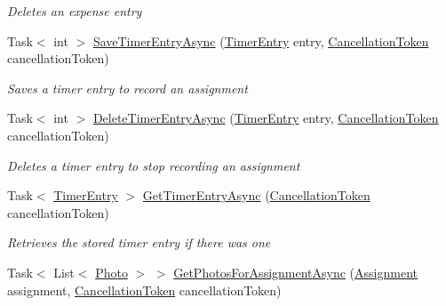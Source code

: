 \begin{DoxyCompactItemize}
\begin{DoxyCompactList}\small\item\em Deletes an expense entry \end{DoxyCompactList}\item 
Task$<$ int $>$ \hyperlink{class_field_service_1_1_tests_1_1_mocks_1_1_mock_assignment_service_a63732bc78fb6e33479130295a5f3618d}{Save\+Timer\+Entry\+Async} (\hyperlink{class_field_service_1_1_data_1_1_timer_entry}{Timer\+Entry} entry, \hyperlink{_view_models_2_assignment_view_model_8cs_aba80ec766846c61f55644fd23860cb18}{Cancellation\+Token} cancellation\+Token)
\begin{DoxyCompactList}\small\item\em Saves a timer entry to record an assignment \end{DoxyCompactList}\item 
Task$<$ int $>$ \hyperlink{class_field_service_1_1_tests_1_1_mocks_1_1_mock_assignment_service_a597928002e4546c7b25cb0cb37b04792}{Delete\+Timer\+Entry\+Async} (\hyperlink{class_field_service_1_1_data_1_1_timer_entry}{Timer\+Entry} entry, \hyperlink{_view_models_2_assignment_view_model_8cs_aba80ec766846c61f55644fd23860cb18}{Cancellation\+Token} cancellation\+Token)
\begin{DoxyCompactList}\small\item\em Deletes a timer entry to stop recording an assignment \end{DoxyCompactList}\item 
Task$<$ \hyperlink{class_field_service_1_1_data_1_1_timer_entry}{Timer\+Entry} $>$ \hyperlink{class_field_service_1_1_tests_1_1_mocks_1_1_mock_assignment_service_ac059b00f06f385dc180e9ff99017f389}{Get\+Timer\+Entry\+Async} (\hyperlink{_view_models_2_assignment_view_model_8cs_aba80ec766846c61f55644fd23860cb18}{Cancellation\+Token} cancellation\+Token)
\begin{DoxyCompactList}\small\item\em Retrieves the stored timer entry if there was one \end{DoxyCompactList}\item 
Task$<$ List$<$ \hyperlink{class_field_service_1_1_data_1_1_photo}{Photo} $>$ $>$ \hyperlink{class_field_service_1_1_tests_1_1_mocks_1_1_mock_assignment_service_aade7ccd217b9b7f237f2891719ff5a4c}{Get\+Photos\+For\+Assignment\+Async} (\hyperlink{class_field_service_1_1_data_1_1_assignment}{Assignment} assignment, \hyperlink{_view_models_2_assignment_view_model_8cs_aba80ec766846c61f55644fd23860cb18}{Cancellation\+Token} cancellation\+Token)

\end{DoxyCompactItemize}
